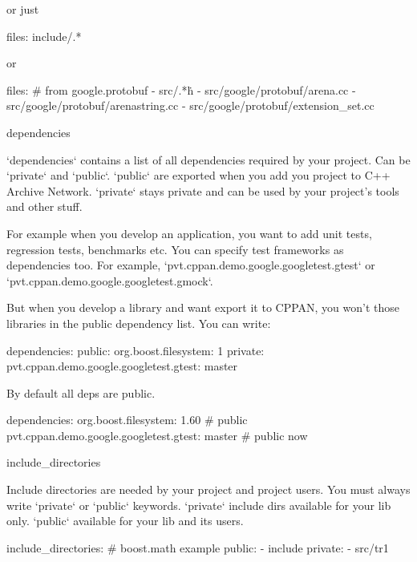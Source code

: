 or just

\begin{cppan}
    files: include/.*
\end{cppan}

or 

\begin{cppan}
    files: # from google.protobuf
      - src/.*\.h
      - src/google/protobuf/arena.cc
      - src/google/protobuf/arenastring.cc
      - src/google/protobuf/extension_set.cc 
\end{cppan}

dependencies

`dependencies` contains a list of all dependencies required by your project. Can be `private` and `public`. `public` are exported when you add you project to C++ Archive Network. `private` stays private and can be used by your project's tools and other stuff.

For example when you develop an application, you want to add unit tests, regression tests, benchmarks etc. You can specify test frameworks as dependencies too. For example, `pvt.cppan.demo.google.googletest.gtest` or `pvt.cppan.demo.google.googletest.gmock`.

But when you develop a library and want export it to CPPAN, you won't those libraries in the public dependency list.
You can write:

\begin{cppan}
    dependencies:
      public:
        org.boost.filesystem: 1
      private:
        pvt.cppan.demo.google.googletest.gtest: master
\end{cppan}

By default all deps are public.

\begin{cppan}
    dependencies:
        org.boost.filesystem: 1.60 # public
        pvt.cppan.demo.google.googletest.gtest: master # public now
\end{cppan}

include_directories

Include directories are needed by your project and project users. You must always write `private` or `public` keywords. `private` include dirs available for your lib only. `public` available for your lib and its users.

\begin{cppan}
    include_directories: # boost.math example
      public:
        - include
      private:
        - src/tr1
\end{cppan}

